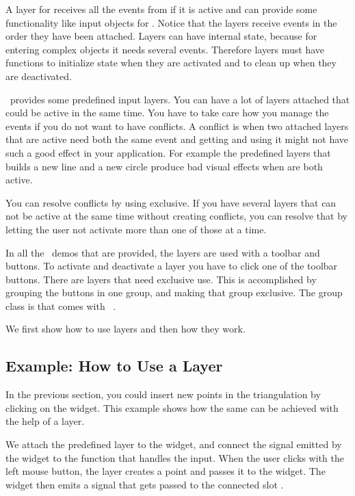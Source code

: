 A layer for  receives all the events from
 if it is active and can provide some functionality
like input objects for . Notice that the layers
receive events in the order they have been attached. Layers can have
internal state, because for entering complex objects it needs several
events. Therefore layers must have functions to initialize state when
they are activated and to clean up when they are deactivated.

\cgal\ provides some predefined input layers. You can have a lot of
layers attached that could be active in the same time. You have to
take care how you manage the events if you do not want to have
conflicts. A conflict is when two attached layers that are active need 
both the same event and getting and using it might not have such a
good effect in your application. For example the predefined layers that 
builds a new line and a new circle produce bad visual effects when are 
both active.

You can resolve conflicts by using  exclusive. If you have 
several layers that can not be active at the same time without creating
conflicts, you can resolve that by letting the user not activate
more than one of those at a time.

\begin{ccAdvanced}
In all the \cgal\ demos that are provided, the layers are used with a
toolbar and buttons. To activate and deactivate a layer you have to
click one of the toolbar buttons. There are layers that need exclusive 
use. This is accomplished by grouping the buttons in one group, and
making that group exclusive. The group class is  that
comes with \qt\ .
\end{ccAdvanced}

We first show how to use layers and then how they work.

\subsection{Example: How to Use a Layer}

In the previous section, you could insert new points in the
triangulation by clicking on the widget. This example shows how
the same can be achieved with the help of a layer.

We attach the predefined layer  to the widget,
and connect the signal emitted by the widget to the function that
handles the input.  When the user clicks with the left mouse button,
the layer creates a point and passes it to the widget. The widget then
emits a signal that gets passed to the connected slot
.

